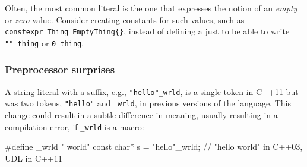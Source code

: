 \noindent Often, the most common literal is the one that expresses the notion of
an \emph{empty} or \emph{zero} value. Consider creating constants for
such values, such as
\lstinline!constexpr!~\lstinline!Thing!~\lstinline!EmptyThing{}!, instead of
defining a  just to be able to write
\lstinline!""_thing! or \lstinline!0_thing!.


%
%

\subsubsection[Preprocessor surprises]{Preprocessor surprises}\label{preprocessor-surprises}

A string literal with a suffix, e.g., \lstinline!"hello"_wrld!, is a
single token in C++11 but was two tokens, \lstinline!"hello"! and
\lstinline!_wrld!, in previous versions of the language. This change could
result in a subtle difference in meaning, usually resulting in a
compilation error, if \lstinline!_wrld! is a macro:

\begin{emcppslisting}
#define _wrld " world"
const char* s = "hello"_wrld;  // "hello world" in C++03, UDL in C++11
\end{emcppslisting}

